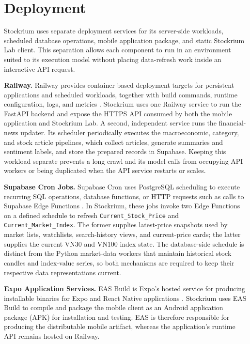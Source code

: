 \section{Deployment}
\label{sec:deployment}

Stockrium uses separate deployment services for its server-side workloads, scheduled database operations, mobile application package, and static Stockrium Lab client. This separation allows each component to run in an environment suited to its execution model without placing data-refresh work inside an interactive API request.

\textbf{Railway.} Railway provides container-based deployment targets for persistent applications and scheduled workloads, together with build commands, runtime configuration, logs, and metrics \cite{railwayServices2026}. Stockrium uses one Railway service to run the FastAPI backend and expose the HTTPS API consumed by both the mobile application and Stockrium Lab. A second, independent service runs the financial-news updater. Its scheduler periodically executes the macroeconomic, category, and stock article pipelines, which collect articles, generate summaries and sentiment labels, and store the prepared records in Supabase. Keeping this workload separate prevents a long crawl and its model calls from occupying API workers or being duplicated when the API service restarts or scales.

\textbf{Supabase Cron Jobs.} Supabase Cron uses PostgreSQL scheduling to execute recurring SQL operations, database functions, or HTTP requests such as calls to Supabase Edge Functions \cite{supabaseCron2026}. In Stockrium, these jobs invoke two Edge Functions on a defined schedule to refresh \texttt{Current\_Stock\_Price} and \texttt{Current\_Market\_Index}. The former supplies latest-price snapshots used by market lists, watchlists, search-history views, and current-price cards; the latter supplies the current VN30 and VN100 index state. The database-side schedule is distinct from the Python market-data workers that maintain historical stock candles and index-value series, so both mechanisms are required to keep their respective data representations current.

\textbf{Expo Application Services.} EAS Build is Expo's hosted service for producing installable binaries for Expo and React Native applications \cite{expoEASBuild2026}. Stockrium uses EAS Build to compile and package the mobile client as an Android application package (APK) for installation and testing. EAS is therefore responsible for producing the distributable mobile artifact, whereas the application's runtime API remains hosted on Railway.

